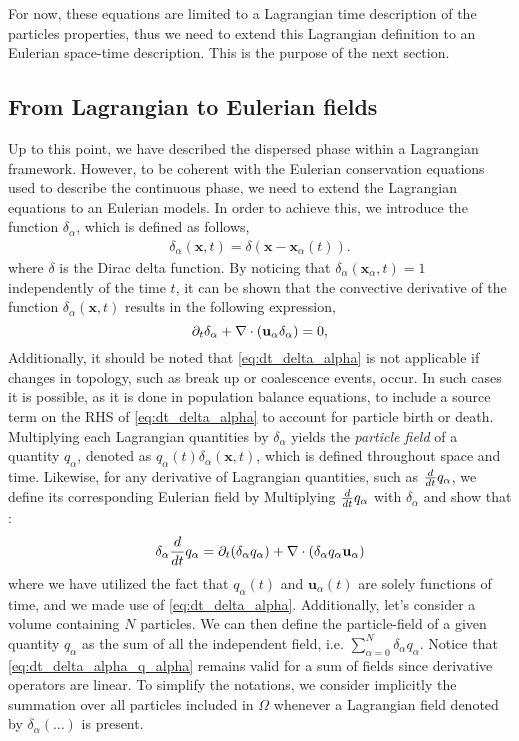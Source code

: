 For now, these equations are limited to a Lagrangian time description of the particles properties, thus we need to extend this Lagrangian definition to an Eulerian space-time description. 
This is the purpose of the next section. 

\subsection{From Lagrangian to Eulerian fields}
Up to this point, we have described the dispersed phase within a Lagrangian framework.
However, to be coherent with the Eulerian conservation equations used to describe the continuous phase, we need to extend the Lagrangian equations to an Eulerian models. 
In order to achieve this, we introduce the function $\delta_\alpha$, which is defined as follows, 
\begin{align}
    \delta_\alpha(\textbf{x},t) = \delta(\textbf{x}-\textbf{x}_\alpha(t)).
    \label{eq:delta_alpha}
\end{align}
where $\delta$ is the Dirac delta function.
By noticing that $\delta_\alpha(\textbf{x}_\alpha,t) = 1$ independently of the time $t$, it can be shown that the convective derivative of the function $\delta_\alpha(\textbf{x},t)$ results in the following expression, 
\begin{equation}
    \partial_t \delta_\alpha
    + \mathbf{\nabla}\cdot (\textbf{u}_\alpha  \delta_\alpha)
    =0,
    \label{eq:dt_delta_alpha}
\end{equation}
Additionally, it should be noted that \ref{eq:dt_delta_alpha} is not applicable if changes in topology, such as break up or coalescence events, occur.
In such cases it is possible, as it is done in population balance equations, to include a source term on the RHS of \ref{eq:dt_delta_alpha} to account for particle birth or death. 
Multiplying each Lagrangian quantities by $\delta_\alpha$ yields the \textit{particle field} of a quantity $q_\alpha$, denoted as $q_\alpha(t)\delta_\alpha(\textbf{x},t)$, which is defined throughout space and time.
Likewise, for any derivative of Lagrangian quantities, such as $\frac{d}{d t} q_\alpha$, we define its corresponding Eulerian field by Multiplying $\frac{d}{d t} q_\alpha$ with $\delta_\alpha$ and show that :
\begin{equation}
    \delta_\alpha \frac{d}{d t} q_\alpha
    = \partial_t (\delta_\alpha q_\alpha)
    + \mathbf{\nabla}\cdot (\delta_\alpha q_\alpha \textbf{u}_\alpha)
    \label{eq:dt_delta_alpha_q_alpha}
\end{equation}
where we have utilized the fact that $q_\alpha(t)$ and $\textbf{u}_\alpha(t)$ are solely functions of time, and we made use of \ref{eq:dt_delta_alpha}.
Additionally, let's consider a volume containing $N$ particles.
We can then define the particle-field of a given quantity $q_\alpha$ as the sum of all the independent field, i.e. $\sum_{\alpha=0}^N \delta_\alpha q_\alpha$.
Notice that \ref{eq:dt_delta_alpha_q_alpha} remains valid for a sum of fields since derivative operators are linear.
To simplify the notations, we consider implicitly the summation over all particles included in $\Omega$ whenever a Lagrangian field denoted by $\delta_\alpha (\ldots)$ is present.

